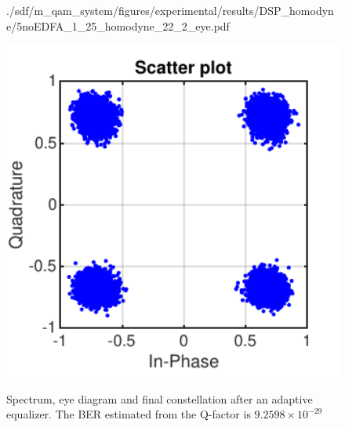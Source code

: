 \begin{figure}[H]
\begin{minipage}{0.30\textwidth}
			{./sdf/m_qam_system/figures/experimental/results/DSP_homodyne/5noEDFA_1_25_homodyne_22_2_eye.pdf}
			\label{fig:1250MBdSpecMF}
		\end{minipage}
		\begin{minipage}{0.30\textwidth}
			\centering
			\includegraphics[width=1\textwidth]
			{./sdf/m_qam_system/figures/experimental/results/DSP_homodyne/5noEDFA_1_25_homodyne_22_2_const.pdf}\\
			\label{fig:1250MBdSpecBefFec}
		\end{minipage}
		\caption{Spectrum, eye diagram and final constellation after an adaptive
		equalizer. The BER estimated from the Q-factor is $9.2598 \times 10^{-29}$}
		\label{fig:1250MBdFinalHmi}
	\end{figure}

